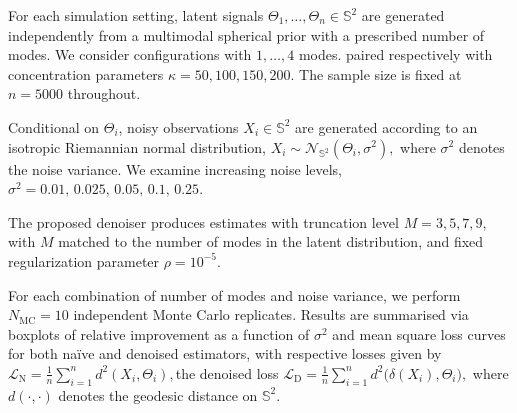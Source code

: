 
For each simulation setting, latent signals \(\Theta_1,\ldots,\Theta_n \in \mathbb{S}^2\) are generated independently from a multimodal spherical prior with a prescribed number of modes. We consider configurations with $1,\ldots,4$ modes.
paired respectively with concentration parameters \(\kappa = 50,100,150,200\). The sample size is fixed at \(n = 5000\) throughout.

Conditional on \(\Theta_i\), noisy observations \(X_i \in \mathbb{S}^2\) are generated according to an isotropic Riemannian normal distribution,
\(
X_i \sim \mathcal{N}_{\mathbb{S}^2}(\Theta_i, \sigma^2),
\)
where \(\sigma^2\) denotes the noise variance. We examine increasing noise levels,
\(
\sigma^2 = 0.01,\,0.025,\,0.05,\,0.1,\,0.25.
\)


The proposed denoiser produces estimates with truncation level \(M = 3,5,7,9\), 
with \(M\) matched to the number of modes in the latent distribution, and fixed regularization parameter \(\rho = 10^{-5}\).


For each combination of number of modes and noise variance, we perform \(N_{\mathrm{MC}} = 10\) independent Monte Carlo replicates. Results are summarised via boxplots of relative improvement as a function of \(\sigma^2\) and mean square loss curves for both naïve and denoised estimators, with respective losses given by
\(
\mathcal{L}_{\mathrm{N}}
= \frac{1}{n} \sum_{i=1}^n d^2(X_i, \Theta_i),
\)the denoised loss
\(
\mathcal{L}_{\mathrm{D}}
= \frac{1}{n} \sum_{i=1}^n d^2\bigl(\delta(X_i), \Theta_i\bigr),
\)
where \(d(\cdot,\cdot)\) denotes the geodesic distance on \(\mathbb{S}^2\).
